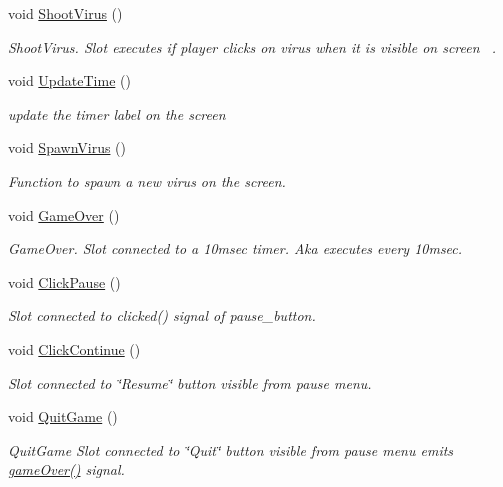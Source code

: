 \begin{DoxyCompactItemize}
\item 
void \hyperlink{classGame1Grid_af541011eb2e1168669dde5b9cdd29a77}{Shoot\+Virus} ()
\begin{DoxyCompactList}\small\item\em Shoot\+Virus. Slot executes if player clicks on virus when it is visible on screen~\newline
. \end{DoxyCompactList}\item 
void \hyperlink{classGame1Grid_a7741eac6d405319474e22549b2e5a727}{Update\+Time} ()
\begin{DoxyCompactList}\small\item\em update the timer label on the screen \end{DoxyCompactList}\item 
void \hyperlink{classGame1Grid_a8ae09d14f2ffbcf3fa65f917ade6fb8d}{Spawn\+Virus} ()
\begin{DoxyCompactList}\small\item\em Function to spawn a new virus on the screen. \end{DoxyCompactList}\item 
void \hyperlink{classGame1Grid_a501210aa672a1e7593cb9be3ff238464}{Game\+Over} ()
\begin{DoxyCompactList}\small\item\em Game\+Over. Slot connected to a 10msec timer. Aka executes every 10msec. \end{DoxyCompactList}\item 
void \hyperlink{classGame1Grid_a9a6e5239a1b09f3f758503c24766583f}{Click\+Pause} ()
\begin{DoxyCompactList}\small\item\em Slot connected to clicked() signal of pause\+\_\+button. \end{DoxyCompactList}\item 
void \hyperlink{classGame1Grid_a82311dcf0ee4d0c41b413e4eb622a695}{Click\+Continue} ()
\begin{DoxyCompactList}\small\item\em Slot connected to \char`\"{}\+Resume\char`\"{} button visible from pause menu. \end{DoxyCompactList}\item 
\mbox{\label{classGame1Grid_acb3fadeeb20d1d8b74ab820745c06551}} 
void \hyperlink{classGame1Grid_acb3fadeeb20d1d8b74ab820745c06551}{Quit\+Game} ()
\begin{DoxyCompactList}\small\item\em Quit\+Game Slot connected to \char`\"{}\+Quit\char`\"{} button visible from pause menu emits \hyperlink{classGame1Grid_ae12a5e01c80683d7d8f3187d8b560a8c}{game\+Over()} signal. \end{DoxyCompactList}\end{DoxyCompactItemize}
